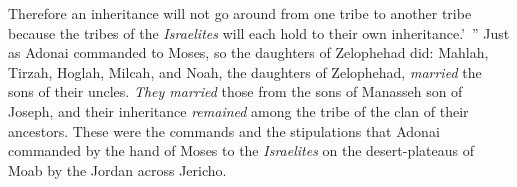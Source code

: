 \begin{biblechapter}
\verse Therefore an inheritance will not go around from one tribe to another tribe because the tribes of the \textit{Israelites} will each hold to their own inheritance.’ ”
\verse Just as Adonai commanded to Moses, so the daughters of Zelophehad did:
\verse Mahlah, Tirzah, Hoglah, Milcah, and Noah, the daughters of Zelophehad, \textit{married} the sons of their uncles.
\verse \textit{They married} those from the sons of Manasseh son of Joseph, and their inheritance \textit{remained} among the tribe of the clan of their ancestors.
\verse These were the commands and the stipulations that Adonai commanded by the hand of Moses to the \textit{Israelites} on the desert-plateaus of Moab by the Jordan across Jericho.
\end{biblechapter}

